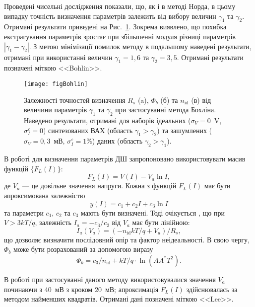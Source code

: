 \documentclass[a4paper,14pt,oneside,openany]{memoir}
\begin{document}
Проведені чисельні дослідження показали, що, як і в методі Норда, в цьому випадку точність визначення параметрів залежить від вибору величин $\gamma_1$ та $\gamma_2$.
Отримані результати приведені на Рис.~\ref{figBohlin}.
Зокрема виявлено, що похибка екстрагування параметрів зростає при збільшенні модуля різниці параметрів $|\gamma_1-\gamma_2|$.
З метою мінімізації помилок методу в подальшому наведені результати, отримані при використанні величин $\gamma_1=1,6$ та $\gamma_2=3,5$.
Отримані результати позначені міткою <<Bohlin>>.

\begin{figure}
\center
\texttt{[image: figBohlin]}%
\caption{\label{figBohlin}
Залежності точностей визначення $R_s$ (a), $\Phi_b$ (б) та $n_\mathrm{id}$ (в) від величини параметрів $\gamma_1$ та $\gamma_2$ при застосуванні метода Бохліна.
Наведено результати, отримані для наборів ідеальних ($\sigma_V=0$~V, $\sigma_I^\varepsilon=0$) синтезованих ВАХ (область $\gamma_1>\gamma_2$) та зашумлених ($\sigma_V=0,3$~мВ, $\sigma_I^\varepsilon=1\%$) даних (область $\gamma_2>\gamma_1$).
}
\end{figure}

В роботі \cite{Lee} для визначення параметрів ДШ запропоновано використовувати масив функцій $\{F_L(I)\}$:
\begin{equation}
\label{eqLee}
F_L(I)=V(I)-V_a\ln I,
\end{equation}
де
$V_a$ --- це довільне значення напруги.
Кожна з функцій $F_L(I)$ має бути апроксимована залежністю
\begin{equation}
\label{eqGrFit}
y(I)=c_1+c_2I+c_3\ln I
\end{equation}
та параметри $c_1$, $c_2$ та $c_3$ мають бути визначені.
Тоді очікується \cite{Lee}, що при $V>3kT/q$,
залежність $I_a=-c_3/c_2$ від $V_a$ має бути лінійною:
\begin{equation}
\label{eqLeeDet}
I_a(V_a)=(-n_\mathrm{id}kT/q+V_a)/R_s,
\end{equation}
що дозволяє визначити послідовний опір та фактор неідеальності.
В свою чергу, $\Phi_b$ може бути розрахований \cite{Lee} за допомогою виразу
\begin{equation}
\label{eqLeeFb}
\Phi_b=c_3/n_\mathrm{id}+kT/q\cdot\ln\left(AA^*T^2\right).
\end{equation}

В роботі при застосуванні даного методу використовувалися значення $V_a$ починаючи з 40~мВ з кроком 20~мВ;
апроксимація $F_L(I)$ здійснювалась за методом найменших квадратів.
Отримані дані позначені міткою <<Lee>>.
\end{document}
